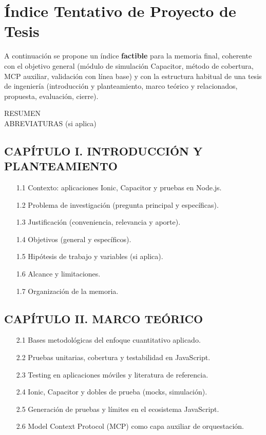 \section{Índice Tentativo de Proyecto de Tesis}
\label{chap:indice_tentativo}

A continuación se propone un índice \textbf{factible} para la memoria final, coherente con el objetivo general (módulo de simulación Capacitor, método de cobertura, MCP auxiliar, validación con línea base) y con la estructura habitual de una tesis de ingeniería (introducción y planteamiento, marco teórico y relacionados, propuesta, evaluación, cierre).

RESUMEN\\
ABREVIATURAS (si aplica)\\

\subsection*{CAPÍTULO I. INTRODUCCIÓN Y PLANTEAMIENTO}
\begin{enumerate}
    \item[1.1] Contexto: aplicaciones Ionic, Capacitor y pruebas en Node.js.
    \item[1.2] Problema de investigación (pregunta principal y específicas).
    \item[1.3] Justificación (conveniencia, relevancia y aporte).
    \item[1.4] Objetivos (general y específicos).
    \item[1.5] Hipótesis de trabajo y variables (si aplica).
    \item[1.6] Alcance y limitaciones.
    \item[1.7] Organización de la memoria.
\end{enumerate}

\subsection*{CAPÍTULO II. MARCO TEÓRICO}
\begin{enumerate}
    \item[2.1] Bases metodológicas del enfoque cuantitativo aplicado.
    \item[2.2] Pruebas unitarias, cobertura y testabilidad en JavaScript.
    \item[2.3] Testing en aplicaciones móviles y literatura de referencia.
    \item[2.4] Ionic, Capacitor y dobles de prueba (mocks, simulación).
    \item[2.5] Generación de pruebas y límites en el ecosistema JavaScript.
    \item[2.6] Model Context Protocol (MCP) como capa auxiliar de orquestación.
\end{enumerate}

